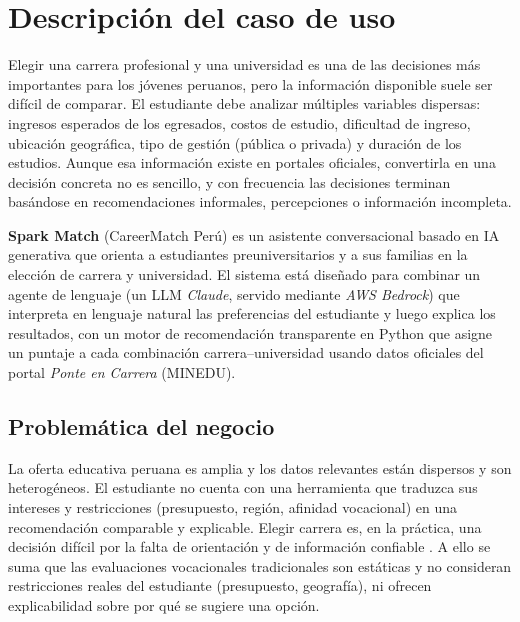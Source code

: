 \section{Descripci\'on del caso de uso}

Elegir una carrera profesional y una universidad es una de las decisiones m\'as
importantes para los j\'ovenes peruanos, pero la informaci\'on disponible suele
ser dif\'icil de comparar. El estudiante debe analizar m\'ultiples variables
dispersas: ingresos esperados de los egresados, costos de estudio, dificultad de
ingreso, ubicaci\'on geogr\'afica, tipo de gesti\'on (p\'ublica o privada) y
duraci\'on de los estudios. Aunque esa informaci\'on existe en portales
oficiales, convertirla en una decisi\'on concreta no es sencillo, y con
frecuencia las decisiones terminan bas\'andose en recomendaciones informales,
percepciones o informaci\'on incompleta.

\textbf{Spark Match} (CareerMatch Per\'u) es un asistente conversacional basado
en IA generativa que orienta a estudiantes preuniversitarios y a sus familias en
la elecci\'on de carrera y universidad. El sistema est\'a dise\~nado para
combinar un agente de lenguaje (un LLM \emph{Claude}, servido mediante
\emph{AWS Bedrock}) que interpreta en lenguaje natural las preferencias del
estudiante y luego explica los resultados, con un motor de recomendaci\'on
transparente en Python que asigne un puntaje a cada combinaci\'on
carrera--universidad usando datos oficiales del portal \emph{Ponte en Carrera}
(MINEDU).

\subsection{Problem\'atica del negocio}

La oferta educativa peruana es amplia y los datos relevantes est\'an dispersos y
son heterog\'eneos. El estudiante no cuenta con una herramienta que traduzca sus
intereses y restricciones (presupuesto, regi\'on, afinidad vocacional) en una
recomendaci\'on comparable y explicable. Elegir carrera es, en la pr\'actica, una
decisi\'on dif\'icil por la falta de orientaci\'on y de informaci\'on confiable
\cite{ezz2020, aldossari2020}. A ello se suma que las evaluaciones vocacionales
tradicionales son est\'aticas y no consideran restricciones reales del estudiante
(presupuesto, geograf\'ia), ni ofrecen explicabilidad sobre por qu\'e se sugiere
una opci\'on.

